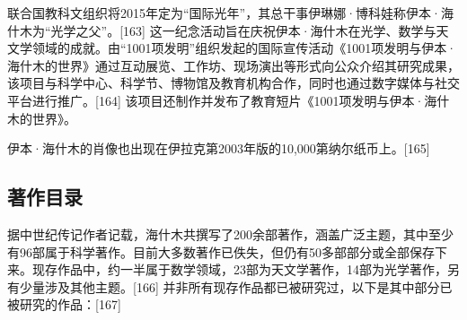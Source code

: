 联合国教科文组织将2015年定为“国际光年”，其总干事伊琳娜·博科娃称伊本·海什木为“光学之父”。[163] 这一纪念活动旨在庆祝伊本·海什木在光学、数学与天文学领域的成就。由“1001项发明”组织发起的国际宣传活动《1001项发明与伊本·海什木的世界》通过互动展览、工作坊、现场演出等形式向公众介绍其研究成果，该项目与科学中心、科学节、博物馆及教育机构合作，同时也通过数字媒体与社交平台进行推广。[164] 该项目还制作并发布了教育短片《1001项发明与伊本·海什木的世界》。

伊本·海什木的肖像也出现在伊拉克第2003年版的10,000第纳尔纸币上。[165]
\subsection{著作目录}
据中世纪传记作者记载，海什木共撰写了200余部著作，涵盖广泛主题，其中至少有96部属于科学著作。目前大多数著作已佚失，但仍有50多部部分或全部保存下来。现存作品中，约一半属于数学领域，23部为天文学著作，14部为光学著作，另有少量涉及其他主题。[166] 并非所有现存作品都已被研究过，以下是其中部分已被研究的作品：[167]
